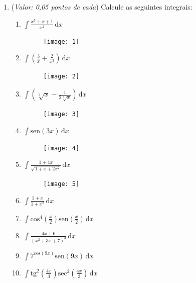 \documentclass[a4paper, 12pt]{article}
\begin{document}
\begin{enumerate}
\item ({\it Valor: 0,05 pontos de cada}) Calcule as seguintes integrais:
  \begin{enumerate}
  \item $ \int \! \frac{x^{5}+x+1}{x^{2}} \, \mathrm{d}x $
\begin{figure}[h!]
  \centering
  \texttt{[image: 1]}
\end{figure} 
    
  \item $ \int \! \left ( \frac{3}{x} + \frac{2}{x^{3}} \right ) \, \mathrm{d}x $\begin{figure}[h!]
  \centering
  \texttt{[image: 2]}
\end{figure} 

  \item $ \int \! \left ( \sqrt[3]{x} - \frac{1}{2 \sqrt[3]{x}} \right ) \, \mathrm{d}x $\begin{figure}[h!]
  \centering
  \texttt{[image: 3]}
\end{figure} 

  \item $ \int \! \mathrm{sen}(3x) \, \mathrm{d}x $
    \begin{figure}[h!]
  \centering
  \texttt{[image: 4]}
\end{figure} 

  \item $ \int \! \frac{1+4x}{\sqrt{1+x+2x^{2}}} \, \mathrm{d}x $
    \begin{figure}[h!]
  \centering
  \texttt{[image: 5]}
\end{figure} 

  \item $ \int \! \frac{1+x}{1+x^{2}} \, \mathrm{d}x $
  \item $ \int \! \mathrm{cos}^{4} \left( \frac{x}{2} \right) \mathrm{sen} \left(\frac{x}{2} \right) \, \mathrm{d}x $
  \item $ \int \! \frac{4x+6}{(x^{2}+3x+7)^{3}} \, \mathrm{d}x $
  \item $ \int \! 7^{\mathrm{cos}(9x)} \mathrm{sen}(9x) \, \mathrm{d}x $
  \item $ \int \! \mathrm{tg}^{2} \left( \frac{4x}{3} \right) \mathrm{sec}^{2} \left(\frac{4x}{3} \right) \, \mathrm{d}x $    
  \end{enumerate}
\end{enumerate}
\end{document}
